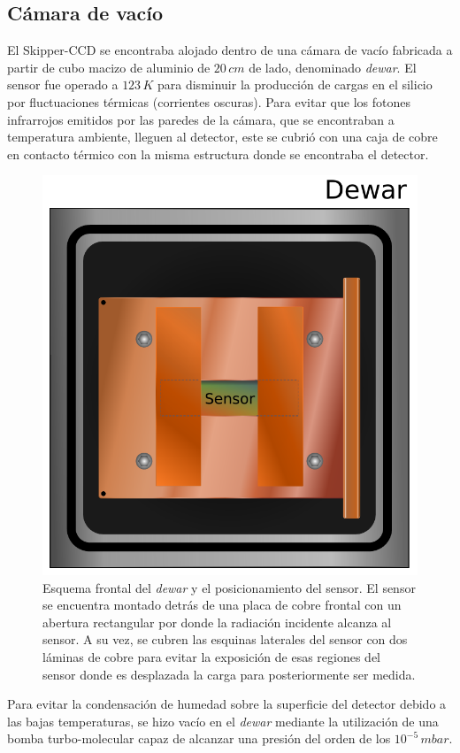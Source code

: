 \subsection{Cámara de vacío}
\noindent El Skipper-CCD se encontraba alojado dentro de una cámara de vacío fabricada a partir de cubo macizo de aluminio de $20\,\si{cm}$ de lado, denominado \textit{dewar}. El sensor fue operado a $123\,\si{K}$ para disminuir la producción de cargas en el silicio por fluctuaciones térmicas (corrientes oscuras). Para evitar que los fotones infrarrojos emitidos por las paredes de la cámara, que se encontraban a temperatura ambiente, lleguen al detector, este se cubrió con una caja de cobre en contacto térmico con la misma estructura donde se encontraba el detector. 
\begin{figure}[h]
    \centering
    \includegraphics[scale=0.5]{Figs/Frontal_Dewar_Sensor.pdf}
    \caption{Esquema frontal del \textit{dewar} y el posicionamiento del sensor. El sensor se encuentra montado detrás de una placa de cobre frontal con un abertura rectangular por donde la radiación incidente alcanza al sensor. A su vez, se cubren las esquinas laterales del sensor con dos láminas de cobre para evitar la exposición de esas regiones del sensor donde es desplazada la carga para posteriormente ser medida.}
    \label{fig:FrontalDewarYSensor}
\end{figure}
Para evitar la condensación de humedad sobre la superficie del detector debido a las bajas temperaturas, se hizo vacío en el \textit{dewar} mediante la utilización de una bomba turbo-molecular capaz de alcanzar una presión del orden de los $10^{-5}\,\si{mbar}$.

